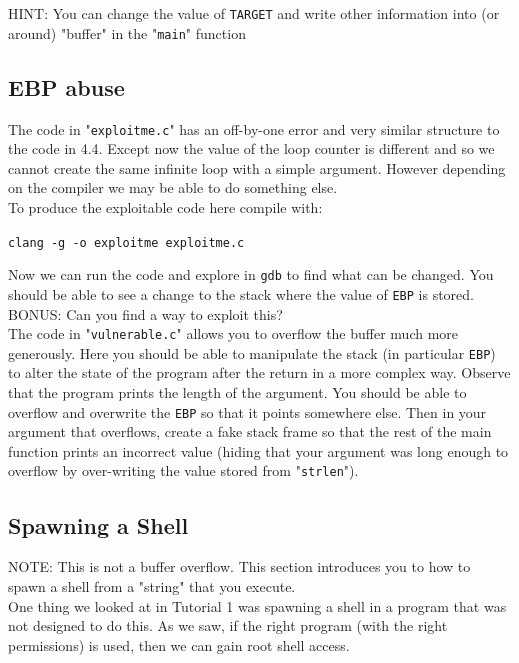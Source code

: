\documentclass{article}
\begin{document}
\noindent HINT: You can change the value of \lstinline{TARGET} and write other information
into (or around) "buffer" in the "\lstinline{main}" function
\subsection{EBP abuse}
The code in "\lstinline{exploitme.c}" has an off-by-one error and very similar structure
to the code in 4.4. Except now the value of the loop counter is different and
so we cannot create the same infinite loop with a simple argument. However
depending on the compiler we may be able to do something else.\\

\noindent To produce the exploitable code here compile with:
\begin{center}
    \lstinline{clang -g -o exploitme exploitme.c}
\end{center}

\noindent Now we can run the code and explore in \lstinline{gdb} to find what can be changed.
You should be able to see a change to the stack where the value of \lstinline{EBP} is stored.\\

\noindent BONUS: Can you find a way to exploit this?\\

\noindent The code in "\lstinline{vulnerable.c}" allows you to overflow the buffer much more generously. Here you should be able to manipulate the stack (in particular \lstinline{EBP}) to alter the state of the program after the return in a more complex way. Observe that the program prints the length of the argument. You should
be able to overflow and overwrite the \lstinline{EBP} so that it points somewhere else.
Then in your argument that overflows, create a fake stack frame so that the
rest of the main function prints an incorrect value (hiding that your argument
was long enough to overflow by over-writing the value stored from "\lstinline{strlen}").


\subsection{Spawning a Shell}
NOTE: This is not a buffer overflow. This section introduces you to how to
spawn a shell from a "string" that you execute.\\

\noindent One thing we looked at in Tutorial 1 was spawning a shell in a program
that was not designed to do this. As we saw, if the right program (with the
right permissions) is used, then we can gain root shell access.\\
\end{document}
